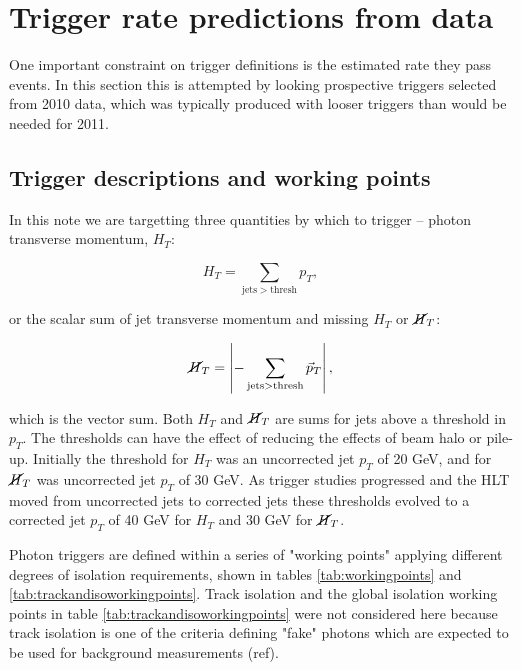 \section{Trigger rate predictions from data}

One important constraint on trigger definitions is the estimated rate they pass events.  In this
section this is attempted by looking prospective triggers selected from 2010 data, which was 
typically produced with looser triggers than would be needed for 2011.  

\subsection{Trigger descriptions and working points}

In this note we are targetting three quantities by which to trigger -- photon transverse momentum, 
$H_T$:

\begin{equation}
H_T = \sum_{\mathrm{jets} > \mathrm{thresh}} p_T,
\end{equation}

or the scalar sum of jet transverse momentum and missing $H_T$ or $\cancel{H}_T$:

\begin{equation}
\cancel{H}_T = \left| -\sum_{\mathrm{jets} > \mathrm{thresh}} \vec{p}_T \right|,
\end{equation}

which is the vector sum.  Both $H_T$ and $\cancel{H}_T$ are sums for jets above a threshold in $p_T$.  
The thresholds can have the effect of reducing the
effects of beam halo or pile-up.
Initially the threshold for $H_T$ was an uncorrected jet $p_T$ of 20 GeV, and for $\cancel{H}_T$ was 
uncorrected jet $p_T$ of 30 GeV.   As trigger studies progressed and the HLT moved from uncorrected jets
to corrected jets these thresholds evolved to a corrected jet $p_T$ of 40 GeV for $H_T$ and 30 GeV for 
$\cancel{H}_T$.

Photon triggers are defined within a series of "working points" applying different degrees of 
isolation requirements, shown in tables \ref{tab:workingpoints} and \ref{tab:trackandisoworkingpoints}.
Track isolation and the global isolation working points in table \ref{tab:trackandisoworkingpoints}
were not considered here because track isolation is one of the criteria defining "fake" photons
which are expected to be used for background measurements (ref).

